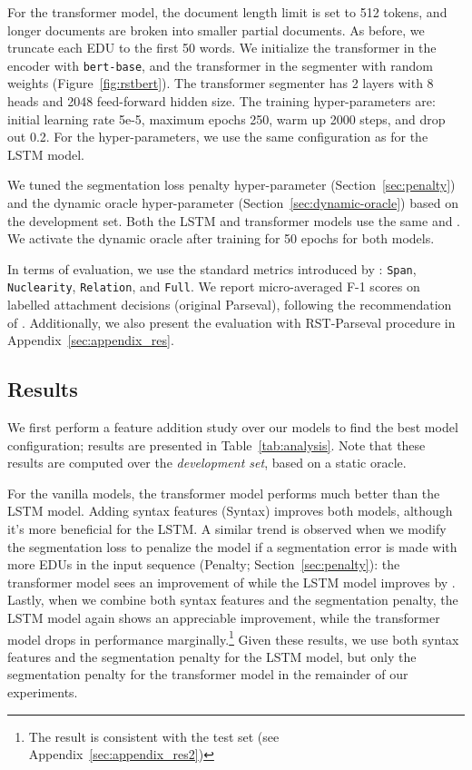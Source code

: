 \documentclass[11pt,a4paper]{article}
\newcommand{\secref}[2][]{Section#1~\ref{sec:#2}}
\newcommand{\tabref}[2][]{Table#1~\ref{tab:#2}}
\newcommand{\figref}[2][]{Figure#1~\ref{fig:#2}}
\newcommand{\appref}[2][]{Appendix#1~\ref{#2}}
\begin{document}
For the transformer model, the document length limit is set to 512
tokens, and longer documents are broken into smaller partial documents.
As before, we truncate each EDU to the first 50 words.
We initialize the transformer in the encoder with \texttt{bert-base},
and the transformer in the segmenter with random weights
(\figref{rstbert}).  The transformer segmenter has 2 layers with 8 heads
and 2048 feed-forward hidden size.  The training hyper-parameters are: initial learning rate  5e-5, maximum epochs  250,
warm up  2000 steps, and drop out  0.2.  For the 
hyper-parameters, we use the same configuration as for the LSTM
model.

We tuned the segmentation loss penalty hyper-parameter 
(\secref{penalty}) and the dynamic oracle hyper-parameter 
(\secref{dynamic-oracle})  based on the development set.
Both the LSTM and transformer models use the same  and
. We activate the dynamic oracle after training for 50
epochs for both models.



In terms of evaluation, we use the standard metrics introduced by
\citet{marcu2000the}: \texttt{Span}, \texttt{Nuclearity},
\texttt{Relation}, and \texttt{Full}. We report micro-averaged F-1 scores on
labelled attachment decisions (original Parseval), following the 
recommendation of \citet{morey-etal-2017-much}.  Additionally, we also 
present the evaluation with RST-Parseval procedure in 
\appref{sec:appendix_res}.







\subsection{Results}
\label{sec:result}


We first perform a feature addition study over our models to find the best model
configuration; results are presented in \tabref{analysis}. Note that
these results are computed over the \textit{development set}, based on a static oracle.

For the vanilla models, the transformer model performs much better than
the LSTM model.  Adding syntax features (Syntax) improves both models, although
it's more beneficial for the LSTM. A similar trend is observed when we
modify the segmentation loss to penalize the model if a segmentation
error is made with more EDUs in the input sequence (Penalty;
\secref{penalty}): the transformer model sees an improvement of  while the
LSTM model improves by .  Lastly, when we combine both syntax features and
the segmentation penalty, the LSTM model again shows an appreciable improvement, while
the transformer model drops in performance marginally.\footnote{The result is consistent with the test set (see \appref{sec:appendix_res2})} Given these results, we
use both syntax features and the segmentation penalty for the LSTM model, but only the
segmentation penalty for the transformer model in the remainder of our experiments.
\end{document}
